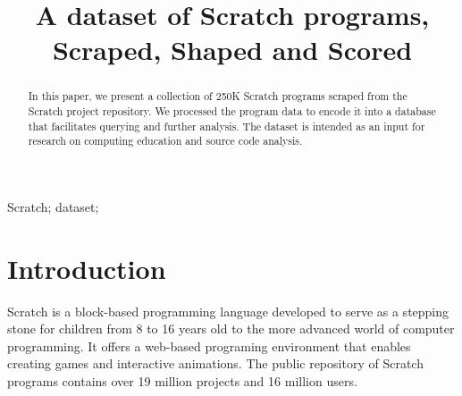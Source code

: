 \documentclass[10pt, conference]{IEEEtran}
\begin{document}
\title{A dataset of Scratch programs,\\Scraped, Shaped and Scored}


\author{
	
}

\maketitle


\begin{abstract}
In this paper, we present a collection of 250K Scratch programs scraped from the Scratch project repository. We processed the program data to encode it into a database that facilitates querying and further analysis. The dataset is intended as an input for research on computing education and source code analysis.
\end{abstract}

\begin{IEEEkeywords}
Scratch; dataset;
\end{IEEEkeywords}


 
\section{Introduction}
Scratch \cite{resnick_scratch:_2009} is a block-based programming language developed to serve as a stepping stone for children from 8 to 16 years old to the more advanced world of computer programming.
It offers a web-based programing environment that enables creating games and interactive animations. The public repository of Scratch programs contains over 19 million projects and 16 million users.
\end{document}
